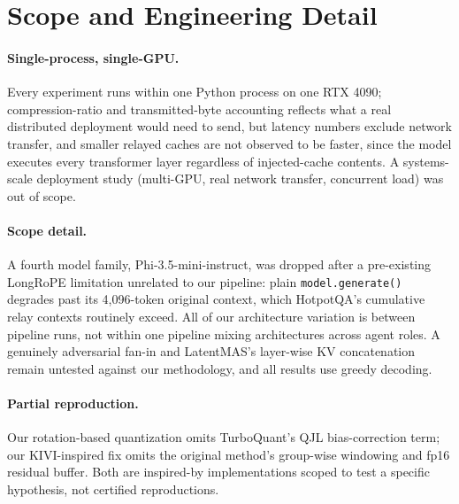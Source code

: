 \documentclass[11pt]{article}
\begin{document}
\section{Scope and Engineering Detail}
\label{app:limitations}

\paragraph{Single-process, single-GPU.} Every experiment runs within
one Python process on one RTX 4090; compression-ratio and
transmitted-byte accounting reflects what a real distributed deployment
would need to send, but latency numbers exclude network transfer, and
smaller relayed caches are not observed to be faster, since the model
executes every transformer layer regardless of injected-cache contents.
A systems-scale deployment study (multi-GPU, real network transfer,
concurrent load) was out of scope.

\paragraph{Scope detail.} A fourth model family, Phi-3.5-mini-instruct, was dropped after a pre-existing LongRoPE limitation unrelated to our pipeline: plain \texttt{model.generate()} degrades past its 4{,}096-token original context, which HotpotQA's cumulative relay contexts routinely exceed. All of our architecture variation is between pipeline runs, not within one pipeline mixing architectures across agent roles. A genuinely adversarial fan-in \citep{latentagentslie2026} and LatentMAS's layer-wise KV concatenation \citep{latentmas2026} remain untested against our methodology, and all results use greedy decoding.

\paragraph{Partial reproduction.} Our rotation-based quantization omits
TurboQuant's QJL bias-correction term; our KIVI-inspired fix omits the
original method's group-wise windowing and fp16 residual buffer. Both
are inspired-by implementations scoped to test a specific hypothesis,
not certified reproductions.
\end{document}
